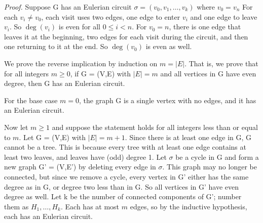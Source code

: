 \documentclass{tufte-handout}
\begin{document}
\textit{Proof.} Suppose G has an Eulerian circuit \(\sigma = (v_0, v_1, \ldots, v_k)\) where \( v_0=v_n \)
For each \( v_i \neq v_0 \), each visit uses two edges, one edge to enter \( v_i \) and one edge to leave \( v_i \).
So \( \deg(v_i) \) is even for all \( 0\leq i < n \). For \( v_0 = n \), there is one edge that leaves it at the
beginning, two edges for each visit during the circuit, and then one returning to it at the end. 
So \( \deg(v_0) \) is even as well.

We prove the reverse implication by induction on \( m = \left|E\right| \). That is,
we prove that for all integers \( m \geq 0 \), if G = (V,E) with \(\left|E\right| = m\) and all
vertices in G have even degree, then G has an Eulerian circuit.

For the base case \( m = 0 \), the graph G is a single vertex with no edges, and it has an Eulerian circuit.

Now let \( m \geq 1 \) and suppose the statement holds for all integers less than or equal to \( m \).
Let G = (V,E) with \(\left|E\right| = m +1 \). Since there is at least one edge in G,
G cannot be a tree. This is because every tree with at least one edge contains at least two leaves,
and leaves have (odd) degree 1. Let \(\sigma\) be a cycle in G
and form a new graph G' = (V,E') by deleting every edge in \(\sigma\). This graph
may no longer be connected, but since we remove a cycle, every vertex in G' either has the
same degree as in G, or degree two less than in G. So all vertices in G' have even degree as well.
Let k be the number of connected components of G'; number them as \( H_1, \ldots, H_k \).
Each has at most \( m \) edges, so by the inductive hypothesis, each has an Eulerian circuit.
\end{document}
